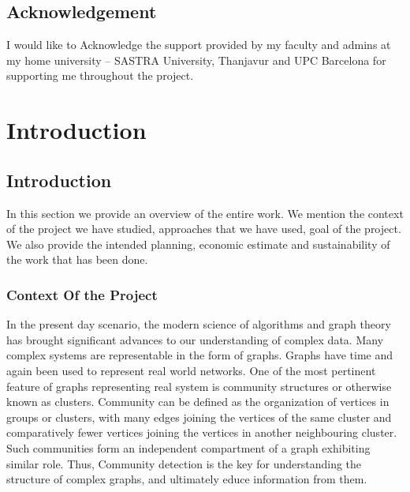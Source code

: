 \newpage
\clearpage
\newpage
\section*{Acknowledgement}
I would like to Acknowledge the support provided by my faculty and admins at my home university -- SASTRA University, Thanjavur and UPC Barcelona for supporting me throughout the project.

\newpage

\tableofcontents
\newpage

\chapter{Introduction}

\section{Introduction}
\setcounter{page}{1}
\par In this section	we provide an overview of the entire work. We mention the context of the project we have studied, approaches that we have used, goal of the project. We also provide the intended planning, economic estimate and sustainability of the work that has been done.


\subsection{Context Of the Project}
\par In the present day scenario, the modern science of algorithms and graph theory has brought significant advances to our understanding of complex data. Many complex systems are representable in the form of graphs. Graphs have time and again been used to represent real world networks. One of the most pertinent feature of graphs representing real system is community structures or otherwise known as clusters. Community can be defined as the organization of vertices in groups or clusters, with many edges joining the vertices of the same cluster and comparatively fewer vertices joining the vertices in another neighbouring cluster. Such communities form an independent compartment of a graph exhibiting similar role.
Thus, Community detection is the key for understanding the structure of complex graphs, and ultimately educe information from them.

